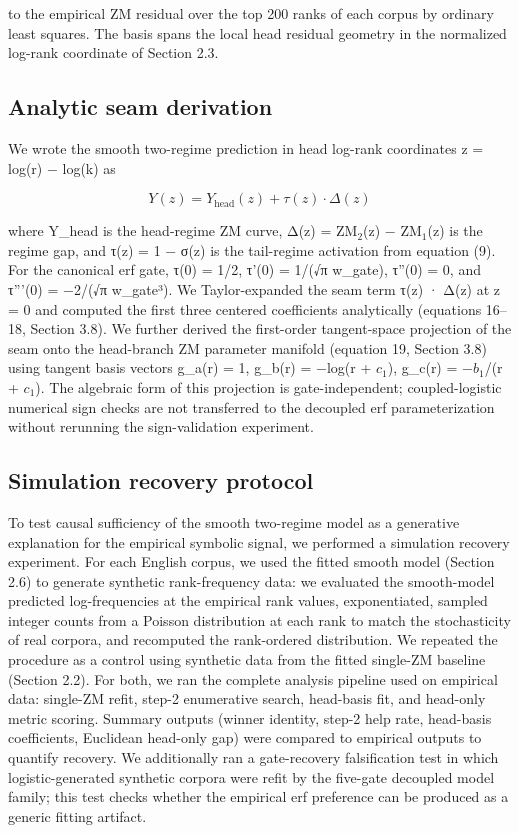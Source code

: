 \documentclass[11pt]{article}
\begin{document}
to the empirical ZM residual over the top 200 ranks of each corpus by ordinary least squares. The basis spans the local head residual geometry in the normalized log-rank coordinate of Section 2.3.

\subsection{Analytic seam derivation}

We wrote the smooth two-regime prediction in head log-rank coordinates z = log(r) − log(k) as

\begin{equation}
\tag{12}\label{eq:seam-form}
Y(z) = Y_{\mathrm{head}}(z) + \tau(z)\cdot \Delta(z)
\end{equation}

where Y\_head is the head-regime ZM curve, Δ(z) = $\mathrm{ZM}_2$(z) − $\mathrm{ZM}_1$(z) is the regime gap, and τ(z) = 1 − σ(z) is the tail-regime activation from equation (9). For the canonical erf gate, τ(0) = 1/2, τ'(0) = 1/(√π w\_gate), τ''(0) = 0, and τ'''(0) = −2/(√π w\_gate³). We Taylor-expanded the seam term τ(z) · Δ(z) at z = 0 and computed the first three centered coefficients analytically (equations 16–18, Section 3.8). We further derived the first-order tangent-space projection of the seam onto the head-branch ZM parameter manifold (equation 19, Section 3.8) using tangent basis vectors g\_a(r) = 1, g\_b(r) = −log(r + $c_1$), g\_c(r) = −$b_1$/(r + $c_1$). The algebraic form of this projection is gate-independent; coupled-logistic numerical sign checks are not transferred to the decoupled erf parameterization without rerunning the sign-validation experiment.

\subsection{Simulation recovery protocol}

To test causal sufficiency of the smooth two-regime model as a generative explanation for the empirical symbolic signal, we performed a simulation recovery experiment. For each English corpus, we used the fitted smooth model (Section 2.6) to generate synthetic rank-frequency data: we evaluated the smooth-model predicted log-frequencies at the empirical rank values, exponentiated, sampled integer counts from a Poisson distribution at each rank to match the stochasticity of real corpora, and recomputed the rank-ordered distribution. We repeated the procedure as a control using synthetic data from the fitted single-ZM baseline (Section 2.2). For both, we ran the complete analysis pipeline used on empirical data: single-ZM refit, step-2 enumerative search, head-basis fit, and head-only metric scoring. Summary outputs (winner identity, step-2 help rate, head-basis coefficients, Euclidean head-only gap) were compared to empirical outputs to quantify recovery. We additionally ran a gate-recovery falsification test in which logistic-generated synthetic corpora were refit by the five-gate decoupled model family; this test checks whether the empirical erf preference can be produced as a generic fitting artifact.
\end{document}
